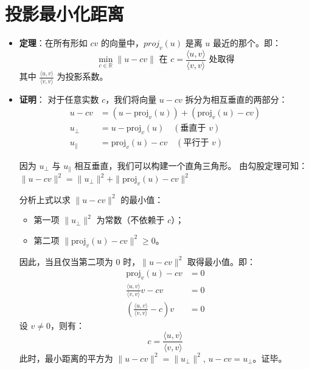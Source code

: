 \documentclass[12pt]{article}
\begin{document}
\section{投影最小化距离}
\begin{flushleft}
    \begin{itemize}
        \item[] \textbf{定理}：在所有形如 $cv$ 的向量中，$proj_{v}(u)$ 是离 $u$ 最近的那个。即：
              $$ \min_{c \in \mathbb{R}} \|u - cv\| \text{ 在 } c = \frac{\langle u, v \rangle}{\langle v, v \rangle} \text{ 处取得} $$
              其中 $\frac{\langle u, v \rangle}{\langle v, v \rangle}$ 为投影系数。

              \vspace{0.5em}
        \item[] \textbf{证明}：
              对于任意实数 $c$，我们将向量 $u - cv$ 拆分为相互垂直的两部分：
              \begin{align*}
                  u - cv        & = (u - \text{proj}_{v}(u)) + (\text{proj}_{v}(u) - cv) \\
                  u_{\perp}     & = u - \text{proj}_{v}(u) \quad (\text{垂直于 } v)         \\
                  u_{\parallel} & = \text{proj}_{v}(u) - cv \quad (\text{平行于 } v)
              \end{align*}

              因为 $u_{\perp}$ 与 $u_{\parallel}$ 相互垂直，我们可以构建一个直角三角形。
              由勾股定理可知：
              $ \|u - cv\|^2 = \|u_{\perp}\|^2 + \|\text{proj}_{v}(u) - cv\|^2 $

              分析上式以求 $\|u - cv\|^2$ 的最小值：
              \begin{itemize}
                  \item 第一项 $\|u_{\perp}\|^2$ 为常数（不依赖于 $c$）；
                  \item 第二项 $\|\text{proj}_{v}(u) - cv\|^2 \ge 0$。
              \end{itemize}
              因此，当且仅当第二项为 $0$ 时，$\|u - cv\|^2$ 取得最小值。即：
              \begin{align*}
                  \text{proj}_{v}(u) - cv                                                & = 0 \\
                  \frac{\langle u, v \rangle}{\langle v, v \rangle} v - cv               & = 0 \\
                  \left( \frac{\langle u, v \rangle}{\langle v, v \rangle} - c \right) v & = 0
              \end{align*}
              设 $v \neq 0$，则有：
              $$ c = \frac{\langle u, v \rangle}{\langle v, v \rangle} $$
              此时，最小距离的平方为 $\|u - cv\|^2 = \|u_{\perp}\|^2$, $u - cv = u_{\perp} $。证毕。
    \end{itemize}
\end{flushleft}
\end{document}
